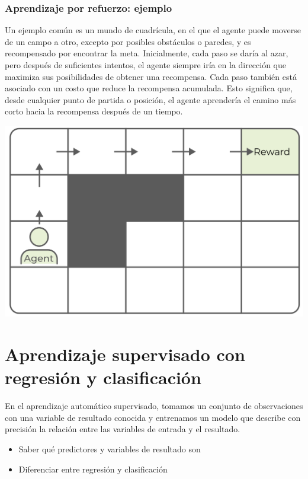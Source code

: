 \documentclass[
]{book}
\providecommand{\tightlist}{%
  \setlength{\itemsep}{0pt}\setlength{\parskip}{0pt}}
\begin{document}
\hypertarget{aprendizaje-por-refuerzo-ejemplo}{%
\subsubsection{Aprendizaje por refuerzo: ejemplo}\label{aprendizaje-por-refuerzo-ejemplo}}

Un ejemplo común es un mundo de cuadrícula, en el que el agente puede moverse de un campo a otro, excepto por posibles obstáculos o paredes, y es recompensado por encontrar la meta. Inicialmente, cada paso se daría al azar, pero después de suficientes intentos, el agente siempre iría en la dirección que maximiza sus posibilidades de obtener una recompensa. Cada paso también está asociado con un costo que reduce la recompensa acumulada. Esto significa que, desde cualquier punto de partida o posición, el agente aprendería el camino más corto hacia la recompensa después de un tiempo.

\includegraphics{img/fs.png}

\hypertarget{aprendizaje-supervisado-con-regresiuxf3n-y-clasificaciuxf3n}{%
\section{Aprendizaje supervisado con regresión y clasificación}\label{aprendizaje-supervisado-con-regresiuxf3n-y-clasificaciuxf3n}}

En el aprendizaje automático supervisado, tomamos un conjunto de observaciones con una variable de resultado conocida y entrenamos un modelo que describe con precisión la relación entre las variables de entrada y el resultado.

\begin{itemize}
\tightlist
\item
  Saber qué predictores y variables de resultado son
\item
  Diferenciar entre regresión y clasificación
\end{itemize}
\end{document}

